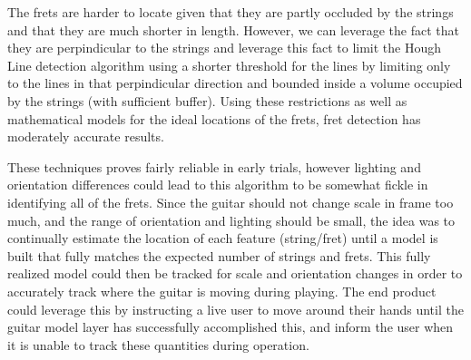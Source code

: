 The frets are harder to locate given that they are partly occluded by the strings and that they are
much shorter in length. However, we can leverage the fact that they are perpindicular to the strings
and leverage this fact to limit the Hough Line detection algorithm using a shorter threshold for the lines
by limiting only to the lines in that perpindicular direction and bounded inside a volume occupied by the strings
(with sufficient buffer). Using these restrictions as well as mathematical models for the ideal locations of
the frets, fret detection has moderately accurate results.
\par
These techniques proves fairly reliable in early trials, however lighting and orientation
differences could lead to this algorithm to be somewhat fickle in identifying all of the frets.
Since the guitar should not change scale in frame too much, and the range of orientation
and lighting should be small, the idea was to continually estimate the location of each feature
(string/fret) until a model is built that fully matches the expected number of strings and frets.
This fully realized model could then be tracked for scale and orientation changes in order to
accurately track where the guitar is moving during playing.
The end product could leverage this by instructing a live user to move around their hands until
the guitar model layer has successfully accomplished this, and inform the user when it is unable
to track these quantities during operation.

